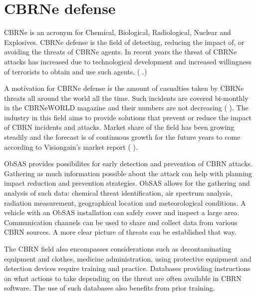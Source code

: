 \documentclass[12pt, a4paper,oneside, nocenter]{thesis}
\renewcommand{\citep}[1]{(\citeauthor{#1} \citeyear{#1}.)}
\renewcommand{\citeyearpar}[1]{(\citeauthor{#1} \citeyear{#1})}
\newcommand{\citeyeartitlexamkinline}[1]{(\usebibentry{#1}{title} \citeyear{#1})}
\begin{document}
\section{CBRNe defense}
CBRNe is an acronym for Chemical, Biological, Radiological, Nuclear and Explosives. CBRNe defense is the field of detecting, reducing the impact of, or avoiding the threats of CBRNe agents. In recent years the threat of CBRNe attacks has increased due to technological development and increased willingness of terrorists to obtain and use such agents. \citep{crowd-behavior}
\par
A motivation for CBRNe defense is the amount of casualties taken by CBRNe threats all around the world all the time. Such incidents are covered bi-monthly in the CBRNeWORLD magazine and their numbers are not decreasing \citeyearpar{cbrne-world}. The industry in this field aims to provide solutions that prevent or reduce the impact of CBRN incidents and attacks. Market share of the field has been growing steadily and the forecast is of continuous growth for the future years to come according to Visiongain's market report \citeyeartitlexamkinline{cbrn-market-share}.
\par
ObSAS provides possibilites for early detection and prevention of CBRN attacks. Gathering as much information possible about the attack can help with planning impact reduction and prevention strategies. ObSAS allows for the gathering and analysis of such data: chemical threat identification, air spectrum analysis, radiation measurement, geographical location and meteorological conditions. A vehicle with an ObSAS installation can safely cover and inspect a large area. Communication channels can be used to share and collect data from various CBRN sources. A more clear picture of threats can be established that way.\par
The CBRN field also encompasses considerations such as decontaminating equipment and clothes, medicine administration, using protective equipment and detection devices require training and practice. Databases providing instructions on what actions to take depending on the threat are often available in CBRN software. The use of such databases also benefits from prior training.
\end{document}
